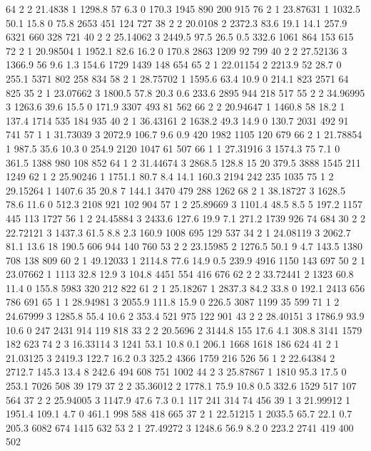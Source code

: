 64	2	2	21.4838	    1	1298.8	57		6.3		0   	170.3	1945	890		200		915
76	2	1	23.87631	1	1032.5	50.1	15.8	0		75.8	2653	451		124		727
38	2	2	20.0108	    2	2372.3	83.6	19.1	14.1	257.9	6321	660		328		721
40	2	2	25.14062	3	2449.5	97.5	26.5	0.5		332.6	1061	864		153		615
72	2	1	20.98504	1	1952.1	82.6	16.2	0		170.8	2863	1209	92		799
40	2	2	27.52136	3	1366.9	56		9.6		1.3		154.6	1729	1439	148		654
65	2	1	22.01154	2	2213.9	52		28.7	0		255.1	5371	802		258		834
58	2	1	28.75702	1	1595.6	63.4	10.9	0		214.1	823		2571	64		825
35	2	1	23.07662	3	1800.5	57.8	20.3	0.6		233.6	2895	944		218		517
55	2	2	34.96995	3	1263.6	39.6	15.5	0		171.9	3307	493		81		562
66	2	2	20.94647	1	1460.8	58		18.2	1		137.4	1714	535		184		935
40	2	1	36.43161	2	1638.2	49.3	14.9	0		130.7	2031	492		91		741
57	1	1	31.73039	3	2072.9	106.7	9.6		0.9		420		1982	1105	120		679
66	2	1	21.78854	1	987.5	35.6	10.3	0		254.9	2120	1047	61		507
66	1	1	27.31916	3	1574.3	75		7.1		0		361.5	1388	980		108		852
64	1	2	31.44674	3	2868.5	128.8	15		20		379.5	3888	1545	211		1249
62	1	2	25.90246	1	1751.1	80.7	8.4		14.1	160.3	2194	242		235		1035
75	1	2	29.15264	1	1407.6	35		20.8	7		144.1	3470	479		288		1262
68	2	1	38.18727	3	1628.5	78.6	11.6	0		512.3	2108	921		102		904
57	1	2	25.89669	3	1101.4	48.5	8.5		5		197.2	1157	445		113		1727
56	1	2	24.45884	3	2433.6	127.6	19.9	7.1		271.2	1739	926		74		684
30	2	2	22.72121	3	1437.3	61.5	8.8		2.3		160.9	1008	695		129		537
34	2	1	24.08119	3	2062.7	81.1	13.6	18		190.5	606		944		140		760
53	2	2	23.15985	2	1276.5	50.1	9		4.7		143.5	1380	708		138		809
60	2	1	49.12033	1	2114.8	77.6	14.9	0.5		239.9	4916	1150	143		697
50	2	1	23.07662	1	1113	32.8	12.9	3		104.8	4451	554		416		676
62	2	2	33.72441	2	1323	60.8	11.4	0		155.8	5983	320		212		822
61	2	1	25.18267	1	2837.3	84.2	33.8	0		192.1	2413	656		786		691
65	1	1	28.94981	3	2055.9	111.8	15.9	0		226.5	3087	1199	35		599
71	1	2	24.67999	3	1285.8	55.4	10.6	2		353.4	521		975		122		901
43	2	2	28.40151	3	1786.9	93.9	10.6	0		247		2431	914		119		818
33	2	2	20.5696	    2	3144.8	155		17.6	4.1		308.8	3141	1579	182		623
74	2	3	16.33114	3	1241	53.1	10.8	0.1		206.1	1668	1618	186		624
41	2	1	21.03125	3	2419.3	122.7	16.2	0.3		325.2	4366	1759	216		526
56	1	2	22.64384	2	2712.7	145.3	13.4	8		242.6	494		608		751		1002
44	2	3	25.87867	1	1810	95.3	17.5	0		253.1	7026	508		39		179
37	2	2	35.36012	2	1778.1	75.9	10.8	0.5		332.6	1529	517		107		564
37	2	2	25.94005	3	1147.9	47.6	7.3		0.1		117		241		314		74		456
39	1	3	21.99912	1	1951.4	109.1	4.7		0		461.1	998		588		418		665
37	2	1	22.51215	1	2035.5	65.7	22.1	0.7		205.3	6082	674		1415	632
53	2	1	27.49272	3	1248.6	56.9	8.2		0		223.2	2741	419		400		502
